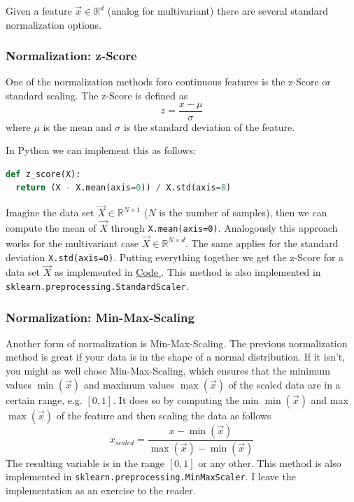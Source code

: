 \documentclass[a4paper]{article}
\newcommand{\coderef}[1]{%
  \hyperref[#1]{Code \numberstringnum{\getrefnumber{#1}}}%
}
\begin{document}
Given a feature $\vec{x} \in \mathbb{R}^d$ (analog for multivariant) there are several standard normalization options.
\subsubsection{Normalization: z-Score}
One of the normalization methods foro continuous features is the z-Score or standard scaling.
The z-Score is defined as
\begin{equation}
  z = \frac{x - \mu}{\sigma}
\end{equation}
where $\mu$ is the mean and $\sigma$ is the standard deviation of the feature.

In Python we can implement this as follows:
\begin{lstlisting}[language=Python, caption={z-Score in Python}, label={code:z-score}]
def z_score(X):
  return (X - X.mean(axis=0)) / X.std(axis=0)
\end{lstlisting}
Imagine the data set $\vec{X} \in \mathbb{R}^{N \times 1}$ ($N$ is the number of samples), then we can compute the mean of $\vec{X}$ through \lstinline{X.mean(axis=0)}.
Analogously this approach works for the multivariant case $\vec{X} \in \mathbb{R}^{N \times d}$.
The same applies for the standard deviation \lstinline{X.std(axis=0)}.
Putting everything together we get the z-Score for a data set $\vec{X}$ as implemented in \coderef{code:z-score}.
This method is also implemented in \lstinline{sklearn.preprocessing.StandardScaler}.
\subsubsection{Normalization: Min-Max-Scaling}
Another form of normalization is Min-Max-Scaling. 
The previous normalization method is great if your data is in the shape of a normal distribution.
If it isn't, you might as well chose Min-Max-Scaling, which ensures that the minimum values $\min(\vec{x})$ and maximum values $\max(\vec{x})$ of the scaled data are in a certain range, e.g. $[0, 1]$.
It does so by computing the min $\min(\vec{x})$ and max $\max(\vec{x})$ of the feature and then scaling the data as follows
\begin{equation}
  x_{scaled} = \frac{x - \min(\vec{x})}{\max(\vec{x}) - \min(\vec{x})}
\end{equation}
The resulting variable is in the range $[0, 1]$ or any other.
This method is also implemented in \lstinline{sklearn.preprocessing.MinMaxScaler}.
I leave the implementation as an exercise to the reader.
\end{document}
